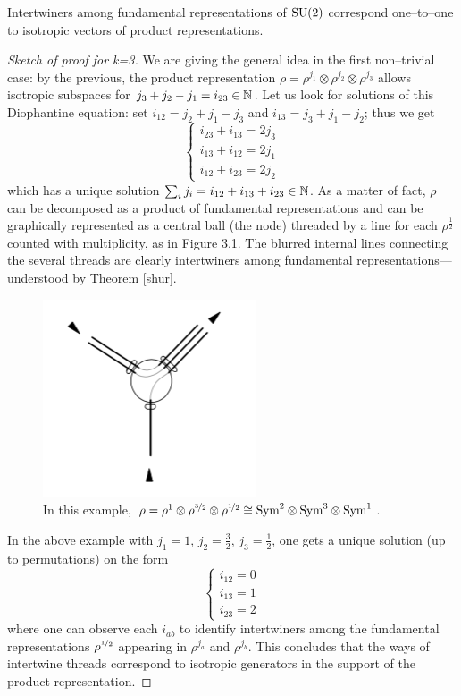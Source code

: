 \begin{teo}\label{intert_isotrop}
    Intertwiners among fundamental representations of $\text{\normalfont SU}(2)$ correspond one--to--one to isotropic vectors of product representations.
\end{teo}
\begin{proof}[Sketch of proof for k=\emph{3}]
    We are giving the general idea in the first non--trivial case: by the previous, the product representation $\rho=\rho^{j_1}\otimes\rho^{j_2}\otimes\rho^{j_3}$ allows isotropic subspaces for $j_3+j_2-j_1=i_{23}\in\mathbb{N}$. Let us look for solutions of this Diophantine equation: set $i_{12}=j_2+j_1-j_3$ and $i_{13}=j_3+j_1-j_2$; thus we get
    $$\begin{cases}
        i_{23}+i_{13}=2j_3\\
        i_{13}+i_{12}=2j_1\\
        i_{12}+i_{23}=2j_2
    \end{cases}$$
    which has a unique solution $\sum_i j_i=i_{12}+i_{13}+i_{23}\in\mathbb{N}$. As a matter of fact, $\rho$ can be decomposed as a product of fundamental representations and can be graphically represented as a central ball (the node) threaded by a line for each $\rho^{\frac{1}{2}}$ counted with multiplicity, as in Figure 3.1. The blurred internal lines connecting the several threads are clearly intertwiners among fundamental representations---understood by Theorem \ref{shur}.\\ 

    \begin{figure}[ht]
    \centering
    \includegraphics[scale=0.5]{images/intert.png}
    \caption{In this example, $\rho=\rho^1\otimes\rho^{\nicefrac{3}{2}}\otimes\rho^{\nicefrac{1}{2}}\cong\text{\normalfont Sym}^2\otimes\text{\normalfont Sym}^3\otimes\text{\normalfont Sym}^1$.}
\end{figure}

 In the above example with $j_1=1,\,j_2=\frac{3}{2},\,j_3=\frac{1}{2}$, one gets a unique solution (up to permutations) on the form
 $$\begin{cases}
     i_{12}=0\\
     i_{13}=1\\
     i_{23}=2
 \end{cases}$$
where one can observe each $i_{ab}$ to identify intertwiners among the fundamental representations $\rho^{\nicefrac{1}{2}}$ appearing in $\rho^{j_a}$ and $\rho^{j_b}$. This concludes that the ways of intertwine threads correspond to isotropic generators in the support of the product representation.
\end{proof}


